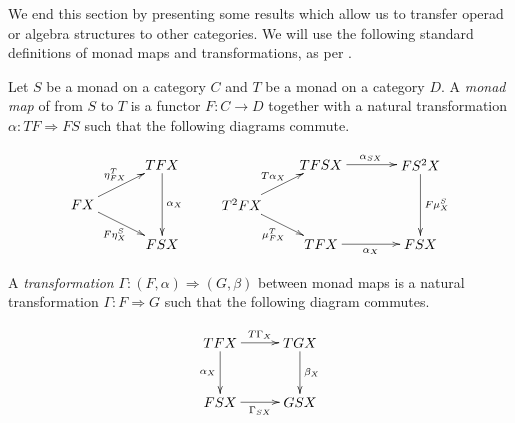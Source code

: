 
We end this section by presenting some results which allow us to transfer operad or algebra structures to other categories. We will use the following standard definitions of monad maps and transformations, as per \cite{street-formal}.

\begin{Defi}\label{defi:monad_map}
Let $S$ be a monad on a category $C$ and $T$ be a monad on a category $D$. A \emph{monad map} of from $S$ to $T$ is a functor $F \colon C \rightarrow D$ together with a natural transformation $\alpha \colon TF \Rightarrow FS$ such that the following diagrams commute.

 \[
    \xy
      (0,0)*+{FX}="a";
      (20,10)*+{TFX}="b";
      (20,-10)*+{FSX}="c";
      {\ar^{\eta^T_{FX}} "a" ; "b"};
      {\ar^{\alpha_X} "b" ; "c"};
      {\ar_{F\eta^S_X} "a" ; "c"};
      (40,0)*+{T^2FX}="a";
      (60,10)*+{TFSX}="b";
      (85,10)*+{FS^2X}="c";
      (60,-10)*+{TFX}="d";
      (85,-10)*+{FSX}="e";
      {\ar^{T\alpha_X} "a" ; "b"};
      {\ar^{\alpha_{SX}} "b" ; "c"};
      {\ar^{F\mu^S_X} "c" ; "e"};
      {\ar_{\mu^T_{FX}} "a" ; "d"};
      {\ar_{\alpha_X} "d" ; "e"};
    \endxy
  \]

A \emph{transformation} $\Gamma \colon (F, \alpha) \Rightarrow (G, \beta)$ between monad maps is a natural transformation $\Gamma \colon F \Rightarrow G$ such that the following diagram commutes.
  
  \[
    \xy
      (0,0)*+{TFX}="a";
      (20,0)*+{TGX}="b";
      (0,-15)*+{FSX}="c";
      (20,-15)*+{GSX}="d";
      {\ar^{T\Gamma_X} "a" ; "b"};
      {\ar^{\beta_X} "b" ; "d"};
      {\ar_{\alpha_X} "a" ; "c"};
      {\ar_{\Gamma_{SX}} "c" ; "d"};
    \endxy
  \]
\end{Defi}

